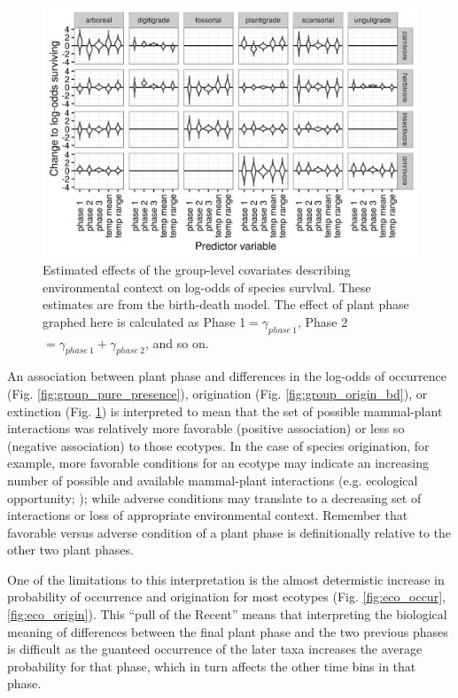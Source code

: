 \documentclass[12pt,letterpaper]{article}
\begin{document}
\begin{figure}[ht]
  \centering
  \includegraphics[width=\textwidth,height=0.4\textheight,keepaspectratio=true]{figure/group_on_survival_bd}
  \caption[Effects of group-level covariates on log-odds of ecotype survival as estimated from the birth-death model]{Estimated effects of the group-level covariates describing environmental context on log-odds of species survlval. These estimates are from the birth-death model. The effect of plant phase graphed here is calculated as Phase 1\( = \gamma_{phase\ 1}\), Phase 2\( = \gamma_{phase\ 1} + \gamma_{phase\ 2}\), and so on.} 
  \label{fig:group_surv_bd}
\end{figure}




An association between plant phase and differences in the log-odds of occurrence (Fig. \ref{fig:group_pure_presence}), origination (Fig. \ref{fig:group_origin_bd}), or extinction (Fig. \ref{fig:group_surv_bd}) is interpreted to mean that the set of possible mammal-plant interactions was relatively more favorable (positive association) or less so (negative association) to those ecotypes. In the case of species origination, for example, more favorable conditions for an ecotype may indicate an increasing number of possible and available mammal-plant interactions (e.g. ecological opportunity; \citealp{Yoder2010,Losos2010,Losos2010a}); while adverse conditions may translate to a decreasing set of interactions or loss of appropriate environmental context. Remember that favorable versus adverse condition of a plant phase is definitionally relative to the other two plant phases. 

One of the limitations to this interpretation is the almost determistic increase in probability of occurrence and origination for most ecotypes (Fig. \ref{fig:eco_occur}, \ref{fig:eco_origin}). This ``pull of the Recent'' means that interpreting the biological meaning of differences between the final plant phase and the two previous phases is difficult as the guanteed occurrence of the later taxa increases the average probability for that phase, which in turn affects the other time bins in that phase.
\end{document}

